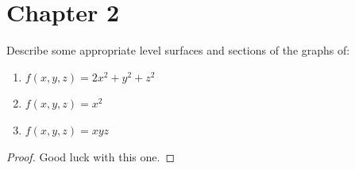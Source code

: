 \documentclass[openany]{book}
\begin{document}
\section{Chapter 2}

\begin{prob}[2]
    Describe some appropriate level surfaces and sections of the graphs of:

    \begin{enumerate}
        \item[(a)] \( f(x, y, z) = 2x^2 + y^2 + z^2 \)
        \item[(b)] \( f(x, y, z) = x^2 \)
        \item[(c)] \( f(x, y, z) = xyz \)
    \end{enumerate}
\end{prob}
\begin{proof}
    Good luck with this one.
\end{proof}
\end{document}
